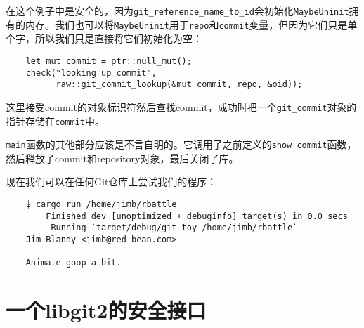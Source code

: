 在这个例子中是安全的，因为\texttt{git\_reference\_name\_to\_id}会初始化\texttt{MaybeUninit}拥有的内存。我们也可以将\texttt{MaybeUninit}用于\texttt{repo}和\texttt{commit}变量，但因为它们只是单个字，所以我们只是直接将它们初始化为空：
\begin{verbatim}
    let mut commit = ptr::null_mut();
    check("looking up commit",
          raw::git_commit_lookup(&mut commit, repo, &oid));
\end{verbatim}

这里接受commit的对象标识符然后查找commit，成功时把一个\texttt{git\_commit}对象的指针存储在\texttt{commit}中。

\texttt{main}函数的其他部分应该是不言自明的。它调用了之前定义的\texttt{show\_commit}函数，然后释放了commit和repository对象，最后关闭了库。

现在我们可以在任何Git仓库上尝试我们的程序：
\begin{verbatim}
    $ cargo run /home/jimb/rbattle
        Finished dev [unoptimized + debuginfo] target(s) in 0.0 secs
         Running `target/debug/git-toy /home/jimb/rbattle`
    Jim Blandy <jimb@red-bean.com>

    Animate goop a bit.
\end{verbatim}

\section{一个libgit2的安全接口}\label{SafeInter}
